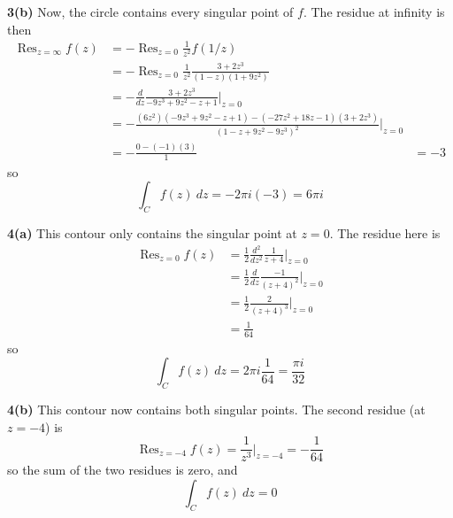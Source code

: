 \documentclass{article}
\DeclareMathOperator{\Res}{Res}
\begin{document}
\textbf{3(b)}
Now, the circle contains every singular point of $f$. The residue at infinity is then
\begin{align*}
	\Res_{z = \infty} f(z)
	&= -\Res_{z = 0} \frac{1}{z^2} f(1/z) \\
	&= -\Res_{z = 0} \frac{1}{z^2} \frac{3 + 2z^3}{(1 - z)(1 + 9z^2)} \\
	&= -\frac{d}{dz} \frac{3 + 2z^3}{-9z^3 + 9z^2 - z + 1} \Big|_{z = 0} \\
	&= -\frac{(6z^2)(-9z^3 + 9z^2 - z + 1) - (-27z^2 + 18z - 1)(3 + 2z^3)}{(1 - z + 9z^2 - 9z^3)^2} \Big|_{z = 0} \\
	&= -\frac{0 - (-1)(3)}{1}
	&= -3
\end{align*}
so
\[
	\int_C f(z)~dz = -2\pi i(-3) = 6\pi i
\]

\textbf{4(a)}
This contour only contains the singular point at $z = 0$. The residue here is
\begin{align*}
	\Res_{z = 0} f(z)
	&= \frac{1}{2} \frac{d^2}{dz^2} \frac{1}{z + 4} \Big|_{z = 0} \\
	&= \frac{1}{2} \frac{d}{dz} \frac{-1}{(z + 4)^2} \Big|_{z = 0} \\
	&= \frac{1}{2} \frac{2}{(z + 4)^3} \Big|_{z = 0} \\
	&= \frac{1}{64}
\end{align*}
so
\[
	\int_C f(z)~dz = 2\pi i \frac{1}{64} = \frac{\pi i}{32}
\]

\textbf{4(b)}
This contour now contains both singular points. The second residue (at $z = -4$) is
\[
	\Res_{z = -4} f(z)
	= \frac{1}{z^3} \Big|_{z = -4}
	= -\frac{1}{64}
\]
so the sum of the two residues is zero, and
\[
	\int_C f(z)~dz = 0
\]
\end{document}
